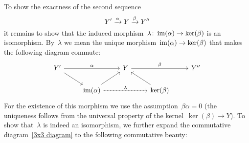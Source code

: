 To show the exactness of the second sequence
\[
  Y' \xrightarrow{\alpha} Y \xrightarrow{\beta} Y''
\]
it remains to show that the induced morphism~$\lambda \colon \operatorname{im}(\alpha) \to \ker(\beta)$ is an isomorphism.
By~$\lambda$ we mean the unique morphism~$\operatorname{im}(\alpha) \to \ker(\beta)$ that makes the following diagram commute:
\[
  \begin{tikzcd}
      Y'
      \arrow{rr}[above]{\alpha}
      \arrow{dr}
    & {}
    & Y
      \arrow{rr}[above]{\beta}
    & {}
    & Y''
    \\
      {}
    & \im(\alpha)
      \arrow{ur}
      \arrow[dashed]{rr}[above]{\lambda}
    & {}
    & \ker(\beta)
      \arrow{ul}
    & {}
  \end{tikzcd}
\]
For the existence of this morphism we use the assumption~$\beta \alpha = 0$ (the uniqueness follows from the universal property of the kernel~$\ker(\beta) \to Y$).
To show that~$\lambda$ is indeed an isomorphism, we further expand the commutative diagram~\eqref{3x3 diagram} to the following commutative beauty:
